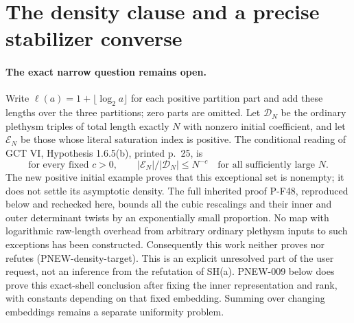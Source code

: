 \section{The density clause and a precise stabilizer converse}
\label{sec:plethysm-density-converse}

\paragraph{The exact narrow question remains open.}
Write $\ell(a)=1+\lfloor\log_2a\rfloor$ for each positive
partition part and add these lengths over the three partitions;
zero parts are omitted.  Let $\mathcal D_N$ be the ordinary
plethysm triples of total length exactly $N$ with nonzero initial
coefficient, and let $\mathcal E_N$ be those whose literal
saturation index is positive.  The conditional reading of
GCT VI, Hypothesis 1.6.5(b), printed p.~25, is
\[
 \text{for every fixed }c>0,\qquad
          |\mathcal E_N|/|\mathcal D_N|\le N^{-c}
                  \quad\text{for all sufficiently large }N.
 \tag{PNEW-density-target}
\]
The new positive initial example proves that this exceptional
set is nonempty; it does not settle its asymptotic density.
The full inherited proof P-F48, reproduced below and rechecked
here, bounds all the cubic rescalings and their inner and outer
determinant twists by an exponentially small proportion.
No map with logarithmic raw-length overhead from arbitrary
ordinary plethysm inputs to such exceptions has been constructed.
Consequently this work neither proves nor refutes
(PNEW-density-target).  This is an explicit unresolved part of
the user request, not an inference from the refutation of SH(a).
PNEW-009 below does prove this exact-shell conclusion after
fixing the inner representation and rank, with constants
depending on that fixed embedding.  Summing over changing
embeddings remains a separate uniformity problem.

